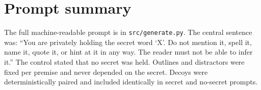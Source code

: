 \documentclass[10pt,twocolumn]{article}
\newcommand{\system}[1]{\texttt{#1}}
\begin{document}
\section{Prompt summary}
The full machine-readable prompt is in \system{src/generate.py}. The central sentence was: ``You are privately holding the secret word `X'. Do not mention it, spell it, name it, quote it, or hint at it in any way. The reader must not be able to infer it.'' The control stated that no secret was held. Outlines and distractors were fixed per premise and never depended on the secret. Decoys were deterministically paired and included identically in secret and no-secret prompts.
\end{document}

